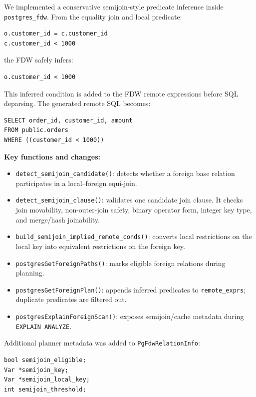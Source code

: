 \documentclass[10pt,a4paper]{article}
\begin{document}
We implemented a conservative semijoin-style predicate inference inside \texttt{postgres\_fdw}. From the equality join and local predicate:

\begin{lstlisting}[style=sqlstyle]
o.customer_id = c.customer_id
c.customer_id < 1000
\end{lstlisting}

the FDW safely infers:

\begin{lstlisting}[style=sqlstyle]
o.customer_id < 1000
\end{lstlisting}

This inferred condition is added to the FDW remote expressions before SQL deparsing. The generated remote SQL becomes:

\begin{lstlisting}[style=sqlstyle]
SELECT order_id, customer_id, amount
FROM public.orders
WHERE ((customer_id < 1000))
\end{lstlisting}

\textbf{Key functions and changes:}

\begin{itemize}
    \item \texttt{detect\_semijoin\_candidate()}: detects whether a foreign base relation participates in a local--foreign equi-join.
    \item \texttt{detect\_semijoin\_clause()}: validates one candidate join clause. It checks join movability, non-outer-join safety, binary operator form, integer key type, and merge/hash joinability.
    \item \texttt{build\_semijoin\_implied\_remote\_conds()}: converts local restrictions on the local key into equivalent restrictions on the foreign key.
    \item \texttt{postgresGetForeignPaths()}: marks eligible foreign relations during planning.
    \item \texttt{postgresGetForeignPlan()}: appends inferred predicates to \texttt{remote\_exprs}; duplicate predicates are filtered out.
    \item \texttt{postgresExplainForeignScan()}: exposes semijoin/cache metadata during \texttt{EXPLAIN ANALYZE}.
\end{itemize}

Additional planner metadata was added to \texttt{PgFdwRelationInfo}:

\begin{lstlisting}[style=sqlstyle]
bool semijoin_eligible;
Var *semijoin_key;
Var *semijoin_local_key;
int semijoin_threshold;
\end{lstlisting}
\end{document}
